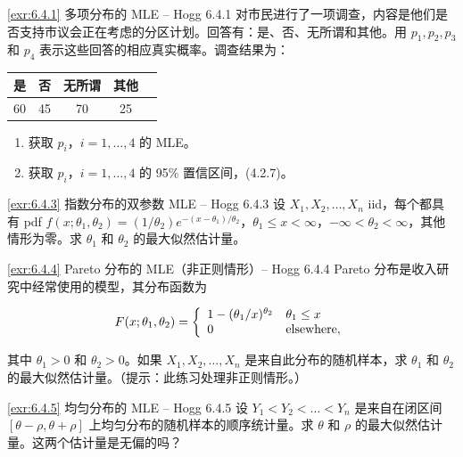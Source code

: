 
\begin{exercise}{\ref{exr:6.4.1} 多项分布的 MLE – Hogg 6.4.1}\label{exr:6.4.1}
对市民进行了一项调查，内容是他们是否支持市议会正在考虑的分区计划。回答有：是、否、无所谓和其他。用 $p_1, p_2, p_3$ 和 $p_4$ 表示这些回答的相应真实概率。调查结果为：

\begin{center}
\begin{tabular}{c|cccc}
是 & 否 & 无所谓 & 其他 \\ \hline
60 & 45 & 70 & 25
\end{tabular}
\end{center}

\begin{enumerate}
\item[(a)] 获取 $p_i$，$i=1,\ldots,4$ 的 MLE。
\item[(b)] 获取 $p_i$，$i=1,\ldots,4$ 的 95\% 置信区间，(4.2.7)。
\end{enumerate}
\end{exercise}

\begin{exercise}{\ref{exr:6.4.3} 指数分布的双参数 MLE – Hogg 6.4.3}\label{exr:6.4.3}
设 $X_1, X_2, \ldots, X_n$ iid，每个都具有 pdf $f(x;\theta_1,\theta_2) = (1/\theta_2)e^{-(x-\theta_1)/\theta_2}$，$\theta_1 \leq x < \infty$，$-\infty < \theta_2 < \infty$，其他情形为零。求 $\theta_1$ 和 $\theta_2$ 的最大似然估计量。
\end{exercise}

\begin{exercise}{\ref{exr:6.4.4} Pareto 分布的 MLE（非正则情形）– Hogg 6.4.4}\label{exr:6.4.4}
Pareto 分布是收入研究中经常使用的模型，其分布函数为

\[
F(x;\theta_1,\theta_2) = \left\{ \begin{array}{l l}
1-(\theta_1/x)^{\theta_2} & \theta_1 \leq x \\
0 & \text{elsewhere},
\end{array} \right.
\]

其中 $\theta_1 > 0$ 和 $\theta_2 > 0$。如果 $X_1, X_2, \ldots, X_n$ 是来自此分布的随机样本，求 $\theta_1$ 和 $\theta_2$ 的最大似然估计量。（提示：此练习处理非正则情形。）
\end{exercise}

\begin{exercise}{\ref{exr:6.4.5} 均匀分布的 MLE – Hogg 6.4.5}\label{exr:6.4.5}
设 $Y_1 < Y_2 < \ldots < Y_n$ 是来自在闭区间 $[\theta-\rho, \theta+\rho]$ 上均匀分布的随机样本的顺序统计量。求 $\theta$ 和 $\rho$ 的最大似然估计量。这两个估计量是无偏的吗？
\end{exercise}

